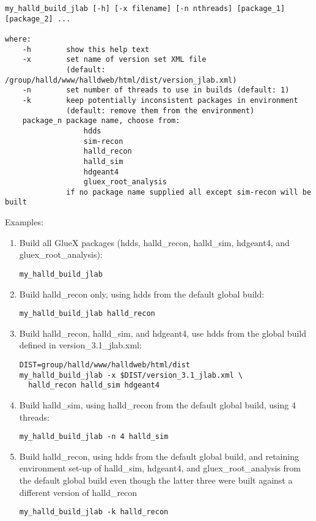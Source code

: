 \documentclass[12pt, letterpaper]{article}
\begin{document}
\begin{verbatim}
my_halld_build_jlab [-h] [-x filename] [-n nthreads] [package_1] [package_2] ...

where:
    -h        show this help text
    -x        set name of version set XML file
              (default: /group/halld/www/halldweb/html/dist/version_jlab.xml)
    -n        set number of threads to use in builds (default: 1)
    -k        keep potentially inconsistent packages in environment
              (default: remove them from the environment)
    package_n package name, choose from:
                  hdds
                  sim-recon
                  halld_recon
                  halld_sim
                  hdgeant4
                  gluex_root_analysis
              if no package name supplied all except sim-recon will be built
\end{verbatim}

Examples:

\begin{enumerate}

\item Build all GlueX packages (hdds, halld\_recon, halld\_sim, hdgeant4, and gluex\_root\_analysis):

\begin{verbatim}
my_halld_build_jlab
\end{verbatim}
  
\item Build halld\_recon only, using hdds from the default global build:

\begin{verbatim}
my_halld_build_jlab halld_recon
\end{verbatim}

\item Build halld\_recon, halld\_sim, and hdgeant4, use hdds from the global build defined in version\_3.1\_jlab.xml:

\begin{verbatim}
DIST=group/halld/www/halldweb/html/dist
my_halld_build_jlab -x $DIST/version_3.1_jlab.xml \
  halld_recon halld_sim hdgeant4
\end{verbatim}
  
\item Build halld\_sim, using halld\_recon from the default global build, using 4 threads:

\begin{verbatim}
my_halld_build_jlab -n 4 halld_sim
\end{verbatim}

\item Build halld\_recon, using hdds from the default global build, and retaining environment set-up of halld\_sim, hdgeant4, and gluex\_root\_analysis from the default global build even though the latter three were built against a different version of halld\_recon

\begin{verbatim}
my_halld_build_jlab -k halld_recon
\end{verbatim}

\end{enumerate}
\end{document}
